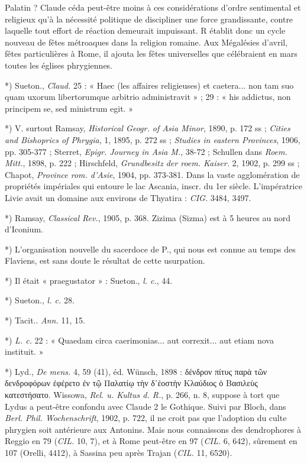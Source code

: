\documentclass[a4paper, 11pt, oneside, polutonikogreek, french]{article}
\begin{document}
Palatin ? Claude céda peut-être moins à ces considérations d'ordre sentimental et religieux qu'à la nécessité politique de discipliner une force grandissante, contre laquelle tout effort de réaction demeurait impuissant. R établit donc un cycle nouveau de fêtes métroaques dans la religion romaine. Aux Mégalésies d'avril, fêtes particulières à Rome, il ajouta les fêtes universelles que célébraient en mars toutes les églises phrygiennes.

*) Sueton., \emph{Claud.} 25 : « Haec (les affaires religieuses) et caetera... non tam suo quam uxorum libertorumque arbitrio administravit » ; 29 : « his addictus, non principem se, sed ministrum egit. »

*) V. surtout Ramsay, \emph{Historical Geogr. of Asia Minor}, 1890, p. 172 ss ; \emph{Cities and Bishoprics of Phrygia}, 1, 1895, p. 272 ss ; \emph{Studies in eastern Provinces}, 1906, pp. 305-377 ; Sterret, \emph{Epigr. Journey in Asia M.}, 38-72 ; Schullen dans \emph{Roem. Mitt.}, 1898, p. 222 ; Hirschfeld, \emph{Grundbesitz der roem. Kaiser.} 2, 1902, p. 299 ss ; Chapot, \emph{Province rom. d'Asie}, 1904, pp. 373-381. Dans la vaste agglomération de propriétés impériales qui entoure le lac Ascania, inscr. du 1er siècle. L'impératrice Livie avait un domaine aux environs de Thyatira : \emph{CIG.} 3484, 3497.

*) Ramsay, \emph{Classical Rev.}, 1905, p. 368. Zizima (Sizma) est à 5 heures au nord d'Iconium.

*) L'organisation nouvelle du sacerdoce de P., qui nous est connue au temps des Flaviens, est sans doute le résultat de cette usurpation. 

*) Il était « praegustator » : Sueton., \emph{l. c.}, 44.

*) Sueton., \emph{l. c.} 28.

*) Tacit.. \emph{Ann.} 11, 15.

*) \emph{L. c.} 22 : « Quaedam circa caerimonias... aut correxit... aut etiam nova instituit. »

*) Lyd., \emph{De mens.} 4, 59 (41), éd. Wünsch, 1898 : δένδρον πίτυς παρὰ τῶν δενδροφόρων ἐφέρετο ἐν τῷ Παλατίῳ τὴν δ᾽έοστὴν Kλαύδιος ὁ Bασιλεὺς κατεστήσατο. Wissowa, \emph{Rel. u. Kultus d. R.}, p. 266, n. 8, suppose à tort que Lydus a peut-être confondu avec Claude 2 le Gothique. Suivi par Bloch, dans \emph{Berl. Phil. Wochenschrift}, 1902, p. 722, il ne croit pas que l'adoption du culte phrygien soit antérieure aux Antonins. Mais nous connaissons des dendrophores à Reggio en 79 (\emph{CIL.} 10, 7), et à Rome peut-être en 97 (\emph{CIL.} 6, 642), sûrement en 107 (Orelli, 4412), à Sassina peu après Trajan (\emph{CIL.} 11, 6520).
\end{document}
